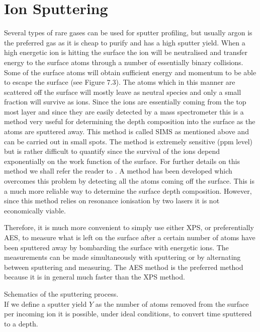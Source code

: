 \section{Ion Sputtering}
Several types of rare gases can be used for sputter profiling, but usually argon is the preferred gas as it is cheap to purify and has a high sputter yield. When a high energetic ion is hitting the surface the ion will be neutralised and transfer energy to the surface atoms through a number of essentially binary collisions. Some of the surface atoms will obtain sufficient energy and momentum to be able to escape the surface (see Figure 7.3). The atoms which in this manner are scattered off the surface will mostly leave as neutral species and only a small fraction will survive as ions. Since the ions are essentially coming from the top most layer and since they are easily detected by a mass spectrometer this is a method very useful for determining the depth composition into the surface as the atoms are sputtered away. This method is called SIMS as mentioned above and can be carried out in small spots. The method is extremely sensitive (ppm level) but is rather difficult to quantify since the survival of the ions depend exponentially on the work function of the surface. For further details on this method we shall refer the reader to \cite{briggs2}. A method has been developed which overcomes this problem by detecting all the atoms coming off the surface. This is a much more reliable way to determine the surface depth composition. However, since this method relies on resonance ionisation by two lasers it is not economically viable.

Therefore, it is much more convenient to simply use either XPS, or preferentially AES, to measure what is left on the surface after a certain number of atoms have been sputtered away by bombarding the surface with energetic  ions. The measurements can be made simultaneously with sputtering or by alternating between sputtering and measuring. The AES method is the preferred method because it is in general much faster than the XPS method. 

 \vspace*{7cm}

  Schematics of the sputtering
 process.\\

If we define a sputter yield $Y$ as the number of atoms removed from the surface per incoming ion it is possible, under ideal conditions, to convert time sputtered to a depth.

